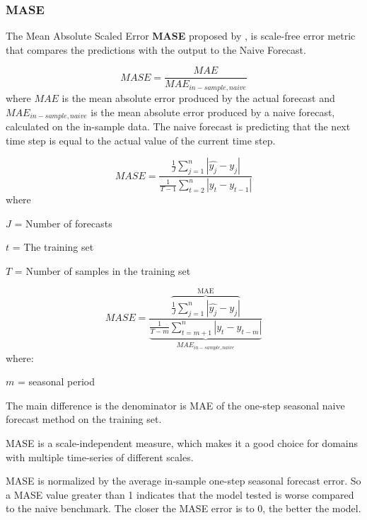 \subsubsection{MASE}
The Mean Absolute Scaled Error \textbf{MASE}
proposed by \cite{Hyndman2006}, is scale-free
error metric that compares the predictions with
the output to the Naive Forecast.


\begin{displaymath}
  MASE = \frac{MAE}{MAE_{in-sample, naive}}
\end{displaymath}
where $MAE$ is the mean absolute error
produced by the actual forecast and
$MAE_{in-sample, naive} $
is the mean absolute error produced by
a naive forecast, calculated on the in-sample data.
The naive forecast is predicting that the next
time step is equal to the actual value of the current time step.


\begin{displaymath}
  \label{eq:MASE}
  MASE = \frac{\frac{1}{J} \sum_{j=1}^n |\hat{y_j} - y_j|}{\frac{1}{T-1} \sum_{t=2}^n |y_t - y_{t-1}|}
\end{displaymath}
where

$J$ = Number of forecasts

$t$ = The training set

$T$ = Number of samples in the training set

\begin{equation}
  \label{eq:MASE-Seasonal}
  MASE = \frac{
    \overbrace{
      \frac{1}{J} \sum_{j=1}^n |\hat{y_j} - y_j|}^\text{MAE}}{
    \underbrace{
      \frac{1}{T-m} \sum_{t=m+1}^n |y_t - y_{t-m}|}_\text{$MAE_{in-sample, naive}$}
  }
\end{equation}
where:

$m$ = seasonal period

The main difference is the denominator is MAE
of the one-step seasonal naive forecast method on the training set.

MASE is a scale-independent measure, which makes it
a good choice for domains with multiple time-series of
different scales.

MASE is normalized by the average in-sample one-step
seasonal forecast error. So a MASE value greater than
1 indicates that the model tested is worse compared
to the naive benchmark.
The closer the MASE error is to 0, the better the model.


